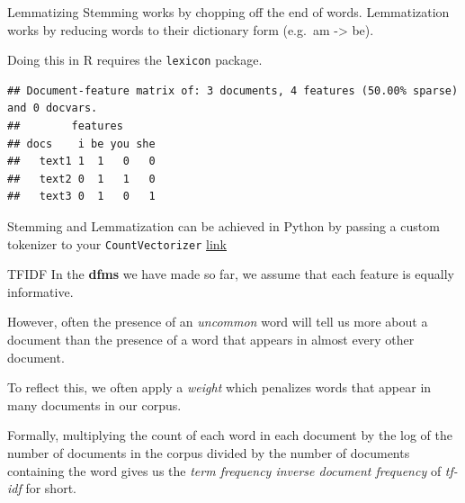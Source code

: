 \documentclass[
  10pt,
  ignorenonframetext,
  aspectratio=169]{beamer}
\newenvironment{Shaded}{\begin{snugshade}}{\end{snugshade}}
\newcommand{\AttributeTok}[1]{\textcolor[rgb]{0.80,0.80,0.80}{#1}}
\newcommand{\FunctionTok}[1]{\textcolor[rgb]{0.94,0.94,0.56}{#1}}
\newcommand{\NormalTok}[1]{\textcolor[rgb]{0.80,0.80,0.80}{#1}}
\newcommand{\OtherTok}[1]{\textcolor[rgb]{0.94,0.94,0.56}{#1}}
\newcommand{\SpecialCharTok}[1]{\textcolor[rgb]{0.86,0.64,0.64}{#1}}
\newcommand{\StringTok}[1]{\textcolor[rgb]{0.80,0.58,0.58}{#1}}
\begin{document}
\begin{frame}[fragile]{Lemmatizing}
\protect\hypertarget{lemmatizing}{}
Stemming works by chopping off the end of words. Lemmatization works by
reducing words to their dictionary form (e.g.~am -\textgreater{} be).

Doing this in R requires the \texttt{lexicon} package.

\smallskip

\scriptsize

\begin{Shaded}
\end{Shaded}

\begin{verbatim}
## Document-feature matrix of: 3 documents, 4 features (50.00% sparse) and 0 docvars.
##        features
## docs    i be you she
##   text1 1  1   0   0
##   text2 0  1   1   0
##   text3 0  1   0   1
\end{verbatim}

\normalsize

Stemming and Lemmatization can be achieved in Python by passing a custom
tokenizer to your \texttt{CountVectorizer}
\href{https://scikit-learn.org/stable/modules/feature_extraction.html\#customizing-the-vectorizer-classes}{link}
\end{frame}

\begin{frame}{TFIDF}
\protect\hypertarget{tfidf}{}
In the \textbf{dfms} we have made so far, we assume that each feature is
equally informative.

However, often the presence of an \emph{uncommon} word will tell us more
about a document than the presence of a word that appears in almost
every other document.

To reflect this, we often apply a \emph{weight} which penalizes words
that appear in many documents in our corpus.

Formally, multiplying the count of each word in each document by the log
of the number of documents in the corpus divided by the number of
documents containing the word gives us the \emph{term frequency inverse
document frequency} of \emph{tf-idf} for short.
\end{frame}
\end{document}
